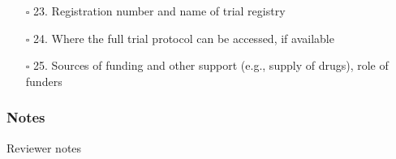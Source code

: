\documentclass[11pt]{article}
\def\tightlist{}
\begin{document}
\begin{Form}
\begin{itemize}
  \begin{itemize}
  \tightlist
  \item[$\square$]
    23. Registration number and name of trial registry
  \item[$\square$]
    24. Where the full trial protocol can be accessed, if available
  \item[$\square$]
    25. Sources of funding and other support (e.g., supply of drugs),
    role of funders
  \end{itemize}
\end{itemize}

\subsubsection{Notes}\label{notes}

{Reviewer notes}

\end{Form}
\end{document}
